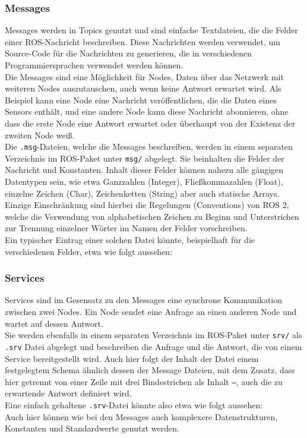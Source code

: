 \subsubsection{Messages}\label{subsubsec:ROS2Messages}
Messages werden in Topics genutzt und sind einfache Textdateien, die die Felder einer \ac{ROS}-Nachricht beschreiben. Diese Nachrichten werden verwendet, um Source-Code für die Nachrichten zu generieren, die in verschiedenen Programmiersprachen verwendet werden können.\\
Die Messages sind eine Möglichkeit für Nodes, Daten über das Netzwerk mit weiteren Nodes auszutauschen, auch wenn keine Antwort erwartet wird. Als Beispiel kann eine Node eine Nachricht veröffentlichen, die die Daten eines Sensors enthält, und eine andere Node kann diese Nachricht abonnieren, ohne dass die erste Node eine Antwort erwartet oder überhaupt von der Existenz der zweiten Node weiß.\\
Die \texttt{.msg}-Dateien, welche die Messages beschreiben, werden in einem separaten Verzeichnis im \ac{ROS}-Paket unter \texttt{msg/} abgelegt. Sie beinhalten die Felder der Nachricht und Konstanten. Inhalt dieser Felder können nahezu alle gängigen Datentypen sein, wie etwa Ganzzahlen (Integer), Fließkommazahlen (Float), einzelne Zeichen (Char), Zeichenketten (String) aber auch statische Arrays. Einzige Einschränkung sind hierbei die Regelungen (Conventions) von \ac{ROS} 2, welche die Verwendung von alphabetischen Zeichen zu Beginn und Unterstrichen zur Trennung einzelner Wörter im Namen der Felder vorschreiben.\\
Ein typischer Eintrag einer solchen Datei könnte, beispielhaft für die verschiedenen Felder, etwa wie folgt aussehen:\\

\subsubsection{Services}\label{subsubsec:ROS2Services}
Services sind im Gesensatz zu den Messages eine synchrone Kommunikation zwischen zwei Nodes. Ein Node sendet eine Anfrage an einen anderen Node und wartet auf dessen Antwort.\\
Sie werden ebenfalls in einem separaten Verzeichnis im \ac{ROS}-Paket unter \texttt{srv/} als \texttt{.srv} Datei abgelegt und beschreiben die Anfrage und die Antwort, die von einem Service bereitgestellt wird. Auch hier folgt der Inhalt der Datei einem festgelegtem Schema ähnlich dessen der Message Dateien, mit dem Zusatz, dass hier getrennt von einer Zeile mit drei Bindestrichen als Inhalt \texttt{---}, auch die zu erwartende Antwort definiert wird.\\
Eine einfach gehaltene \texttt{.srv}-Datei könnte also etwa wie folgt aussehen:\\
Auch hier können wie bei den Messages auch komplexere Datenstrukturen, Konstanten und Standardwerte genutzt werden.\\

